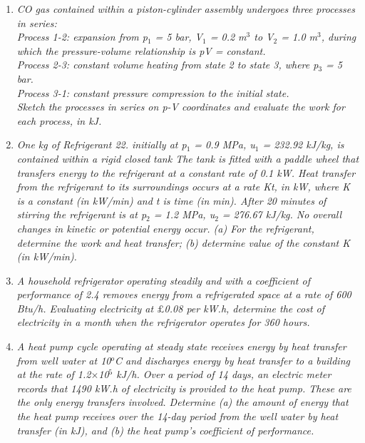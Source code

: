 \begin{enumerate}
\item {\it CO gas contained within a piston-cylinder assembly undergoes three processes in series:\\
       Process 1-2: expansion from p$_{1}$ = 5 bar, V$_{1}$ = 0.2 m$^{3}$ to V$_{2}$ = 1.0 m$^{3}$, during which the pressure-volume relationship is pV = constant.\\
       Process 2-3: constant volume heating from state 2 to state 3, where p$_{3}$ = 5 bar.\\
       Process 3-1: constant pressure compression to the initial state.\\
       Sketch the processes in series on p-V coordinates and evaluate the work for each process, in kJ.}

\item {\it One kg of Refrigerant 22. initially at p$_{1}$ = 0.9 MPa, u$_{1}$ = 232.92 kJ/kg, is contained within a rigid closed tank The tank is fitted with a paddle wheel that transfers energy to the refrigerant at a constant rate of 0.1 kW. Heat transfer from the refrigerant to its surroundings occurs at a rate Kt, in kW, where K is a constant (in kW/min) and t is time (in min).  After 20 minutes of stirring the refrigerant is at p$_{2}$ = 1.2 MPa, u$_{2}$ = 276.67 kJ/kg. No overall changes in kinetic or potential energy occur. (a) For the refrigerant, determine the work and heat transfer; (b) determine value of the constant K (in kW/min).}

\item {\it A household refrigerator operating steadily and with a coefficient of performance of 2.4 removes energy from a refrigerated  space at a rate of 600 Btu/h. Evaluating electricity at $\pounds$0.08 per kW.h, determine the cost of electricity in a month when the refrigerator operates for 360 hours.}

\item {\it A heat pump cycle operating at steady state receives energy by heat transfer from well water at 10$^{o}$C and discharges energy by heat transfer to a building at the rate of 1.2$\times$10$^{5}$ kJ/h. Over a period of 14 days, an electric meter records that 1490 kW.h of electricity is provided to the heat pump. These are the only energy transfers involved.  Determine (a) the amount of energy that the heat pump receives over the 14-day period from the well water by heat transfer (in kJ), and (b) the heat pump's coefficient of performance.}



\end{enumerate}
